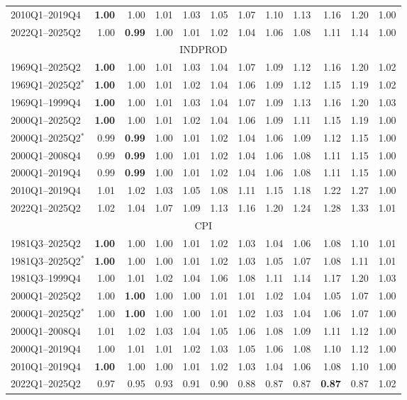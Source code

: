 \begin{tabular}{lrrrrrrrrrrr}
2010Q1--2019Q4 & \textbf{1.00} & 1.00 & 1.01 & 1.03 & 1.05 & 1.07 & 1.10 & 1.13 & 1.16 & 1.20 & 1.00 \\
2022Q1--2025Q2 & 1.00 & \textbf{0.99} & 1.00 & 1.01 & 1.02 & 1.04 & 1.06 & 1.08 & 1.11 & 1.14 & 1.00 \\
\hline
\multicolumn{12}{c}{INDPROD} \\
1969Q1--2025Q2 & \textbf{1.00} & 1.00 & 1.01 & 1.03 & 1.04 & 1.07 & 1.09 & 1.12 & 1.16 & 1.20 & 1.02 \\
1969Q1--2025Q2$^*$ & \textbf{1.00} & 1.00 & 1.01 & 1.02 & 1.04 & 1.06 & 1.09 & 1.12 & 1.15 & 1.19 & 1.02 \\
1969Q1--1999Q4 & \textbf{1.00} & 1.00 & 1.01 & 1.03 & 1.04 & 1.07 & 1.09 & 1.13 & 1.16 & 1.20 & 1.03 \\
2000Q1--2025Q2 & \textbf{1.00} & 1.00 & 1.01 & 1.02 & 1.04 & 1.06 & 1.09 & 1.11 & 1.15 & 1.19 & 1.00 \\
2000Q1--2025Q2$^*$ & 0.99 & \textbf{0.99} & 1.00 & 1.01 & 1.02 & 1.04 & 1.06 & 1.09 & 1.12 & 1.15 & 1.00 \\
2000Q1--2008Q4 & 0.99 & \textbf{0.99} & 1.00 & 1.01 & 1.02 & 1.04 & 1.06 & 1.08 & 1.11 & 1.15 & 1.00 \\
2000Q1--2019Q4 & 0.99 & \textbf{0.99} & 1.00 & 1.01 & 1.02 & 1.04 & 1.06 & 1.08 & 1.11 & 1.15 & 1.00 \\
2010Q1--2019Q4 & 1.01 & 1.02 & 1.03 & 1.05 & 1.08 & 1.11 & 1.15 & 1.18 & 1.22 & 1.27 & 1.00 \\
2022Q1--2025Q2 & 1.02 & 1.04 & 1.07 & 1.09 & 1.13 & 1.16 & 1.20 & 1.24 & 1.28 & 1.33 & 1.01 \\
\hline
\multicolumn{12}{c}{CPI} \\
1981Q3--2025Q2 & \textbf{1.00} & 1.00 & 1.00 & 1.01 & 1.02 & 1.03 & 1.04 & 1.06 & 1.08 & 1.10 & 1.01 \\
1981Q3--2025Q2$^*$ & \textbf{1.00} & 1.00 & 1.00 & 1.01 & 1.02 & 1.03 & 1.05 & 1.07 & 1.08 & 1.11 & 1.01 \\
1981Q3--1999Q4 & 1.00 & 1.01 & 1.02 & 1.04 & 1.06 & 1.08 & 1.11 & 1.14 & 1.17 & 1.20 & 1.03 \\
2000Q1--2025Q2 & 1.00 & \textbf{1.00} & 1.00 & 1.00 & 1.01 & 1.01 & 1.02 & 1.04 & 1.05 & 1.07 & 1.00 \\
2000Q1--2025Q2$^*$ & 1.00 & \textbf{1.00} & 1.00 & 1.00 & 1.01 & 1.02 & 1.03 & 1.04 & 1.06 & 1.07 & 1.00 \\
2000Q1--2008Q4 & 1.01 & 1.02 & 1.03 & 1.04 & 1.05 & 1.06 & 1.08 & 1.09 & 1.11 & 1.12 & 1.00 \\
2000Q1--2019Q4 & 1.00 & 1.01 & 1.01 & 1.02 & 1.03 & 1.05 & 1.06 & 1.08 & 1.10 & 1.12 & 1.00 \\
2010Q1--2019Q4 & \textbf{1.00} & 1.00 & 1.00 & 1.01 & 1.02 & 1.03 & 1.04 & 1.06 & 1.08 & 1.10 & 1.00 \\
2022Q1--2025Q2 & 0.97 & 0.95 & 0.93 & 0.91 & 0.90 & 0.88 & 0.87 & 0.87 & \textbf{0.87} & 0.87 & 1.02 \\
\hline
\end{tabular}
